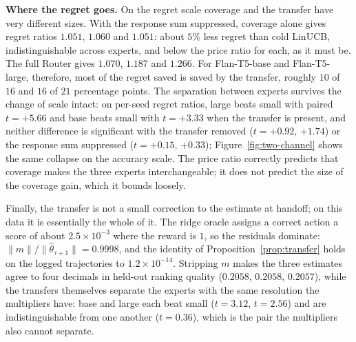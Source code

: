 \documentclass{article}
\theoremstyle{definition}
\theoremstyle{remark}
\theoremstyle{remark}
\begin{document}
\textbf{Where the regret goes.} On the regret scale coverage and the transfer
have very different sizes. With the response sum suppressed, coverage alone gives
regret ratios $1.051$, $1.060$ and $1.051$: about $5\%$ less regret than cold
LinUCB, indistinguishable across experts, and below the price ratio for each,
as it must be. The full Router gives $1.070$, $1.187$ and $1.266$. For
Flan-T5-base and Flan-T5-large, therefore, most of the regret saved is saved
by the transfer, roughly $10$ of $16$ and $16$ of $21$ percentage points. The
separation between experts survives the change of scale intact: on per-seed
regret ratios, large beats small with paired $t=+5.66$ and base beats small
with $t=+3.33$ when the transfer is present, and neither difference is
significant with the transfer removed ($t=+0.92$, $+1.74$) or the response sum
suppressed ($t=+0.15$, $+0.33$); Figure~\ref{fig:two-channel} shows the same
collapse on the accuracy scale. The price ratio correctly predicts that
coverage makes the three experts interchangeable; it does not predict the size
of the coverage gain, which it bounds loosely.

Finally, the transfer is not a small correction to the estimate at handoff; on
this data it is essentially the whole of it. The ridge oracle assigns a
correct action a score of about $2.5\times10^{-3}$ where the reward is $1$, so
the residuals dominate: $\|m\|/\|\widehat\theta_{\tau+1}\|=0.9998$, and the
identity of Proposition~\ref{prop:transfer} holds on the logged trajectories
to $1.2\times10^{-14}$. Stripping $m$ makes the three estimates agree to four
decimals in held-out ranking quality ($0.2058$, $0.2058$, $0.2057$), while the
transfers themselves separate the experts with the same resolution the
multipliers have: base and large each beat small ($t=3.12$, $t=2.56$) and are
indistinguishable from one another ($t=0.36$), which is the pair the
multipliers also cannot separate.
\end{document}
